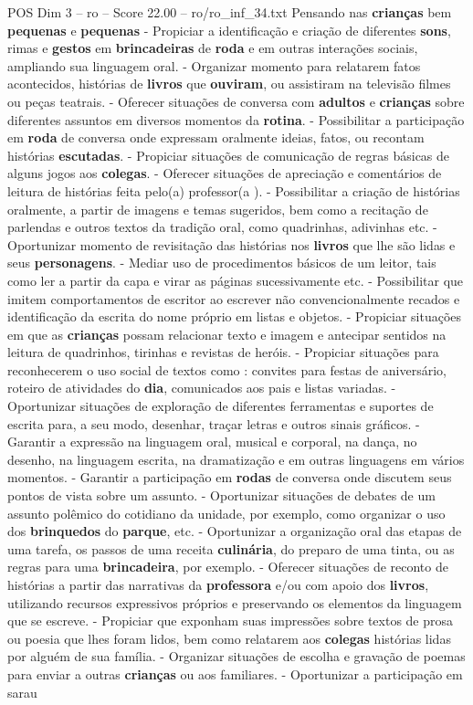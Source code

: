 \begin{textsample}{POS Dim 3 – ro – Score 22.00 – ro/ro\_inf\_34.txt}  \label{ex:f3_pos_140}
Pensando nas \textbf{crianças} bem \textbf{pequenas} e \textbf{pequenas} - Propiciar a identificação e criação de diferentes \textbf{sons}, rimas e \textbf{gestos} em \textbf{brincadeiras} de \textbf{roda} e em outras interações sociais, ampliando sua linguagem oral. - Organizar momento para relatarem fatos acontecidos, histórias de \textbf{livros} que \textbf{ouviram}, ou assistiram na televisão filmes ou peças teatrais. - Oferecer situações de conversa com \textbf{adultos} e \textbf{crianças} sobre diferentes assuntos em diversos momentos da \textbf{rotina}. - Possibilitar a participação em \textbf{roda} de conversa onde expressam oralmente ideias, fatos, ou recontam histórias \textbf{escutadas}. - Propiciar situações de comunicação de regras básicas de alguns jogos aos \textbf{colegas}. - Oferecer situações de apreciação e comentários de leitura de histórias feita pelo(a) professor(a ). - Possibilitar a criação de histórias oralmente, a partir de imagens e temas sugeridos, bem como a recitação de parlendas e outros textos da tradição oral, como quadrinhas, adivinhas etc. - Oportunizar momento de revisitação das histórias nos \textbf{livros} que lhe são lidas e seus \textbf{personagens}. - Mediar uso de procedimentos básicos de um leitor, tais como ler a partir da capa e virar as páginas sucessivamente etc. - Possibilitar que imitem comportamentos de escritor ao escrever não convencionalmente recados e identificação da escrita do nome próprio em listas e objetos. - Propiciar situações em que as \textbf{crianças} possam relacionar texto e imagem e antecipar sentidos na leitura de quadrinhos, tirinhas e revistas de heróis. - Propiciar situações para reconhecerem o uso social de textos como : convites para festas de aniversário, roteiro de atividades do \textbf{dia}, comunicados aos pais e listas variadas. - Oportunizar situações de exploração de diferentes ferramentas e suportes de escrita para, a seu modo, desenhar, traçar letras e outros sinais gráficos. - Garantir a expressão na linguagem oral, musical e corporal, na dança, no desenho, na linguagem escrita, na dramatização e em outras linguagens em vários momentos. - Garantir a participação em \textbf{rodas} de conversa onde discutem seus pontos de vista sobre um assunto. - Oportunizar situações de debates de um assunto polêmico do cotidiano da unidade, por exemplo, como organizar o uso dos \textbf{brinquedos} do \textbf{parque}, etc. - Oportunizar a organização oral das etapas de uma tarefa, os passos de uma receita \textbf{culinária}, do preparo de uma tinta, ou as regras para uma \textbf{brincadeira}, por exemplo. - Oferecer situações de reconto de histórias a partir das narrativas da \textbf{professora} e/ou com apoio dos \textbf{livros}, utilizando recursos expressivos próprios e preservando os elementos da linguagem que se escreve. - Propiciar que exponham suas impressões sobre textos de prosa ou poesia que lhes foram lidos, bem como relatarem aos \textbf{colegas} histórias lidas por alguém de sua família. - Organizar situações de escolha e gravação de poemas para enviar a outras \textbf{crianças} ou aos familiares. - Oportunizar a participação em sarau 
\end{textsample}
